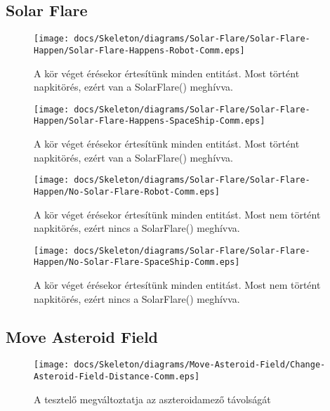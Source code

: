 \subsection{Solar Flare}

\begin{figure}[H] 
    \centering 
    \texttt{[image: docs/Skeleton/diagrams/Solar-Flare/Solar-Flare-Happen/Solar-Flare-Happens-Robot-Comm.eps]} 
    \caption{A kör véget érésekor értesítünk minden entitást. Most történt napkitörés, ezért van a SolarFlare() meghívva.} 
\end{figure}

\begin{figure}[H] 
    \centering 
    \texttt{[image: docs/Skeleton/diagrams/Solar-Flare/Solar-Flare-Happen/Solar-Flare-Happens-SpaceShip-Comm.eps]} 
    \caption{A kör véget érésekor értesítünk minden entitást. Most történt napkitörés, ezért van a SolarFlare() meghívva.} 
\end{figure} 

\begin{figure}[H] 
    \centering 
    \texttt{[image: docs/Skeleton/diagrams/Solar-Flare/Solar-Flare-Happen/No-Solar-Flare-Robot-Comm.eps]} 
    \caption{A kör véget érésekor értesítünk minden entitást. Most nem történt napkitörés, ezért nincs a SolarFlare() meghívva.} 
\end{figure}

\begin{figure}[H] 
    \centering 
    \texttt{[image: docs/Skeleton/diagrams/Solar-Flare/Solar-Flare-Happen/No-Solar-Flare-SpaceShip-Comm.eps]} 
    \caption{A kör véget érésekor értesítünk minden entitást. Most nem történt napkitörés, ezért nincs a SolarFlare() meghívva.} 
\end{figure}


\subsection{Move Asteroid Field}

\begin{figure}[H] 
    \centering 
    \texttt{[image: docs/Skeleton/diagrams/Move-Asteroid-Field/Change-Asteroid-Field-Distance-Comm.eps]} 
    \caption{A tesztelő megváltoztatja az aszteroidamező távolságát} 
\end{figure}